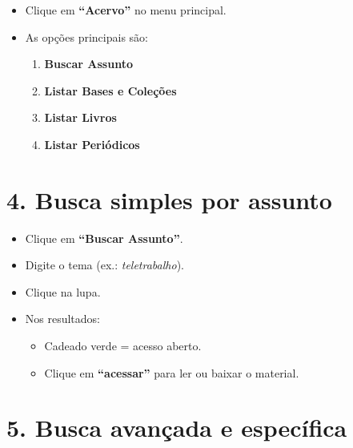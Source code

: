 \documentclass[
  letterpaper,
  DIV=11,
  numbers=noendperiod]{scrreprt}
\providecommand{\tightlist}{%
  \setlength{\itemsep}{0pt}\setlength{\parskip}{0pt}}
\begin{document}
\begin{itemize}
\tightlist
\item
  Clique em \textbf{``Acervo''} no menu principal.
\item
  As opções principais são:

  \begin{enumerate}
  \def\labelenumi{\arabic{enumi}.}
  \tightlist
  \item
    \textbf{Buscar Assunto}
  \item
    \textbf{Listar Bases e Coleções}
  \item
    \textbf{Listar Livros}
  \item
    \textbf{Listar Periódicos}
  \end{enumerate}
\end{itemize}

\section{4. Busca simples por assunto}\label{busca-simples-por-assunto}

\begin{itemize}
\tightlist
\item
  Clique em \textbf{``Buscar Assunto''}.
\item
  Digite o tema (ex.: \emph{teletrabalho}).
\item
  Clique na lupa.
\item
  Nos resultados:

  \begin{itemize}
  \tightlist
  \item
    Cadeado verde = acesso aberto.
  \item
    Clique em \textbf{``acessar''} para ler ou baixar o material.
  \end{itemize}
\end{itemize}

\section{5. Busca avançada e
específica}\label{busca-avanuxe7ada-e-especuxedfica}
\end{document}
